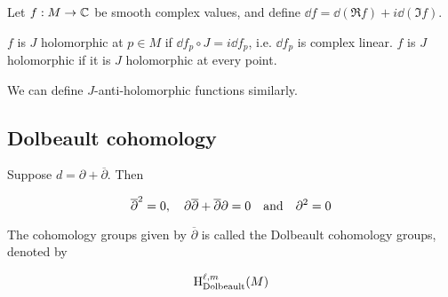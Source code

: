 Let \(f : M \to \mathbb{C}\) be smooth complex values, and define \(\dd f = \dd (\Re f) + i \dd (\Im f)\).

\begin{definition}

    \(f\) is \(J\) holomorphic at \(p \in M\) if \(\dd f_p \circ J = i\dd f_p\), i.e. \(\dd f_p\) is complex linear. \(f\) is \(J\) holomorphic if it is \(J\) holomorphic at every point.
\end{definition}

\begin{remark}
    We can define \(J\)-anti-holomorphic functions similarly.
\end{remark}

\subsection{Dolbeault cohomology}

\begin{lemma}
    Suppose \(d = \partial + \overline\partial\). Then

    \[\overline\partial^2 = 0, \quad \partial\overline\partial + \overline\partial\partial = 0 \qqtext{and}\partial^2 = 0\]
\end{lemma}

\begin{definition}

    The cohomology groups given by \(\overline \partial\) is called the Dolbeault cohomology groups, denoted by

    \[\mathrm{H}_\mathrm{Dolbeault}^{\ell, m}(M)\]
\end{definition}
